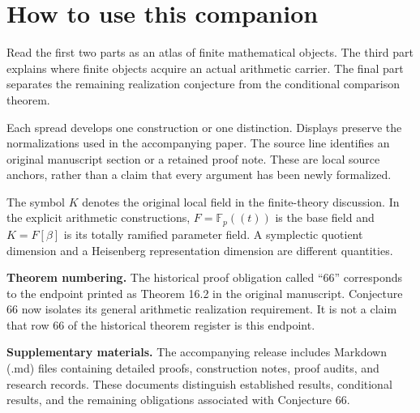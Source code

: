 \documentclass[11pt,letterpaper]{article}
\newcommand\F{\mathbb F}\newcommand\C{\mathbb C}\newcommand\OO{\mathcal O}
\begin{document}
\KomorebiCover
{}

\section*{How to use this companion}
Read the first two parts as an atlas of finite mathematical objects. The third part explains where finite objects acquire an actual arithmetic carrier. The final part separates the remaining realization conjecture from the conditional comparison theorem.

Each spread develops one construction or one distinction. Displays preserve the normalizations used in the accompanying paper. The source line identifies an original manuscript section or a retained proof note. These are local source anchors, rather than a claim that every argument has been newly formalized.

The symbol $K$ denotes the original local field in the finite-theory discussion. In the explicit arithmetic constructions, $F=\F_p((t))$ is the base field and $K=F[\beta]$ is its totally ramified parameter field. A symplectic quotient dimension and a Heisenberg representation dimension are different quantities.

\textbf{Theorem numbering.} The historical proof obligation called ``66'' corresponds to the endpoint printed as Theorem 16.2 in the original manuscript. Conjecture 66 now isolates its general arithmetic realization requirement. It is not a claim that row 66 of the historical theorem register is this endpoint.

\textbf{Supplementary materials.} The accompanying release includes Markdown (.md) files containing detailed proofs, construction notes, proof audits, and research records. These documents distinguish established results, conditional results, and the remaining obligations associated with Conjecture 66.
\end{document}

